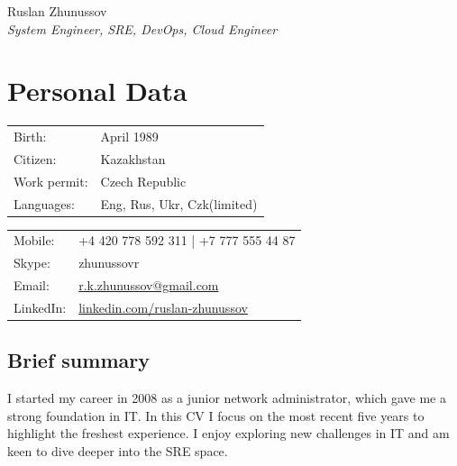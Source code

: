 \documentclass[a4paper,10pt]{article}
\def\name{Ruslan Zhunussov}
\begin{document}
{\huge \name \\}
\textit{System Engineer, SRE, DevOps, Cloud Engineer}

\section*{Personal Data}
\begin{minipage}{0.45\linewidth}
    \begin{tabular}{ll}
        Birth: &  April 1989\\
        Citizen: &  Kazakhstan \\
        Work permit: & Czech Republic \\
        Languages: & Eng, Rus, Ukr, Czk(limited) \\
      \end{tabular}
\end{minipage}
\begin{minipage}{0.45\linewidth}
    \begin{tabular}{ll}
      Mobile: & +4 420 778 592 311 | +7 777 555 44 87 \\
      Skype: &  zhunussovr \\
      Email: & \href{mailto:r.k.zhunussov@gmail.com}{r.k.zhunussov@gmail.com} \\
      LinkedIn: & \href{https://www.linkedin.com/in/ruslan-zhunussov-6b575a5a}{linkedin.com/ruslan-zhunussov} \\
    \end{tabular}
\end{minipage}

\subsection*{Brief summary}
\textnormal{I started my career in 2008 as a junior network administrator, which gave me a strong foundation in IT. In this CV I focus on the most recent five years to highlight the freshest experience. I enjoy exploring new challenges in IT and am keen to dive deeper into the SRE space.}
\end{document}
